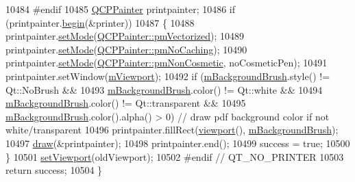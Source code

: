 \begin{DoxyCode}
10484 \textcolor{preprocessor}{#endif}
10485   \hyperlink{class_q_c_p_painter}{QCPPainter} printpainter;
10486   \textcolor{keywordflow}{if} (printpainter.\hyperlink{class_q_c_p_painter_a0a41146ccd619dceab6e25ec7b46b044}{begin}(&printer))
10487   \{
10488     printpainter.\hyperlink{class_q_c_p_painter_af6b1f7d2bbc548b10aa55d8b6ad49577}{setMode}(\hyperlink{class_q_c_p_painter_a156cf16444ff5e0d81a73c615fdb156daeda679cd55dcd468341d07d48a30b6ab}{QCPPainter::pmVectorized});
10489     printpainter.\hyperlink{class_q_c_p_painter_af6b1f7d2bbc548b10aa55d8b6ad49577}{setMode}(\hyperlink{class_q_c_p_painter_a156cf16444ff5e0d81a73c615fdb156dae78f9a4eb277a5f9207f50850a51a0b0}{QCPPainter::pmNoCaching});
10490     printpainter.\hyperlink{class_q_c_p_painter_af6b1f7d2bbc548b10aa55d8b6ad49577}{setMode}(\hyperlink{class_q_c_p_painter_a156cf16444ff5e0d81a73c615fdb156dac1e481bfaf408f2bd2eaad3ec341f36b}{QCPPainter::pmNonCosmetic}, noCosmeticPen);
10491     printpainter.setWindow(\hyperlink{class_q_custom_plot_ac0a7c38a715526c257cff95774f83ab6}{mViewport});
10492     \textcolor{keywordflow}{if} (\hyperlink{class_q_custom_plot_a3aef5de4ac012178e3293248e9c63737}{mBackgroundBrush}.style() != Qt::NoBrush &&
10493         \hyperlink{class_q_custom_plot_a3aef5de4ac012178e3293248e9c63737}{mBackgroundBrush}.color() != Qt::white &&
10494         \hyperlink{class_q_custom_plot_a3aef5de4ac012178e3293248e9c63737}{mBackgroundBrush}.color() != Qt::transparent &&
10495         \hyperlink{class_q_custom_plot_a3aef5de4ac012178e3293248e9c63737}{mBackgroundBrush}.color().alpha() > 0) \textcolor{comment}{// draw pdf background color if not
       white/transparent}
10496       printpainter.fillRect(\hyperlink{class_q_custom_plot_a953ecdbc28018e7e84cb6213ad3d88c2}{viewport}(), \hyperlink{class_q_custom_plot_a3aef5de4ac012178e3293248e9c63737}{mBackgroundBrush});
10497     \hyperlink{class_q_custom_plot_ad7a7d878bf050f101a43008e7d8fdb52}{draw}(&printpainter);
10498     printpainter.end();
10499     success = \textcolor{keyword}{true};
10500   \}
10501   \hyperlink{class_q_custom_plot_a3f9bc4b939dd8aaba9339fd09f273fc4}{setViewport}(oldViewport);
10502 \textcolor{preprocessor}{#endif // QT\_NO\_PRINTER}
10503   \textcolor{keywordflow}{return} success;
10504 \}
\end{DoxyCode}


